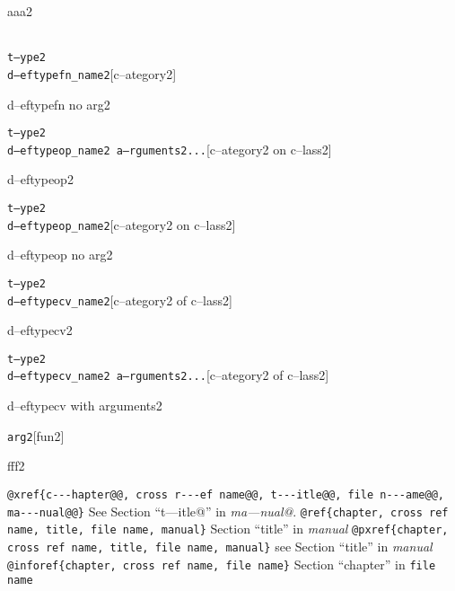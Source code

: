 \documentclass{book}
\begin{document}
%
aaa2

\noindent\texttt\bgroup{}\leavevmode{}\\t--ype2\leavevmode{}\\d--eftypefn\_name2\egroup{}\hfill[c--ategory2]



%
d--eftypefn no arg2

\noindent\texttt\bgroup{}t--ype2\leavevmode{}\\d--eftypeop\_name2 a--rguments2...\egroup{}\hfill[c--ategory2 on c--lass2]



%
d--eftypeop2

\noindent\texttt\bgroup{}t--ype2\leavevmode{}\\d--eftypeop\_name2\egroup{}\hfill[c--ategory2 on c--lass2]



%
d--eftypeop no arg2

\noindent\texttt\bgroup{}t--ype2\leavevmode{}\\d--eftypecv\_name2\egroup{}\hfill[c--ategory2 of c--lass2]



%
d--eftypecv2

\noindent\texttt\bgroup{}t--ype2\leavevmode{}\\d--eftypecv\_name2 a--rguments2...\egroup{}\hfill[c--ategory2 of c--lass2]



%
d--eftypecv with arguments2

\noindent\texttt\bgroup{}arg2\egroup{}\hfill[fun2]



%
fff2


\texttt{@xref\{c{-}{-}{-}hapter@@, cross r{-}{-}{-}ef name@@, t{-}{-}{-}itle@@, file n{-}{-}{-}ame@@, ma{-}{-}{-}nual@@\}} See Section ``t---itle@'' in \textit{ma---nual@}.
\texttt{@ref\{chapter, cross ref name, title, file name, manual\}} Section ``title'' in \textit{manual}
\texttt{@pxref\{chapter, cross ref name, title, file name, manual\}} see Section ``title'' in \textit{manual}
\texttt{@inforef\{chapter, cross ref name, file name\}} Section ``chapter'' in \texttt{file name}
\end{document}
